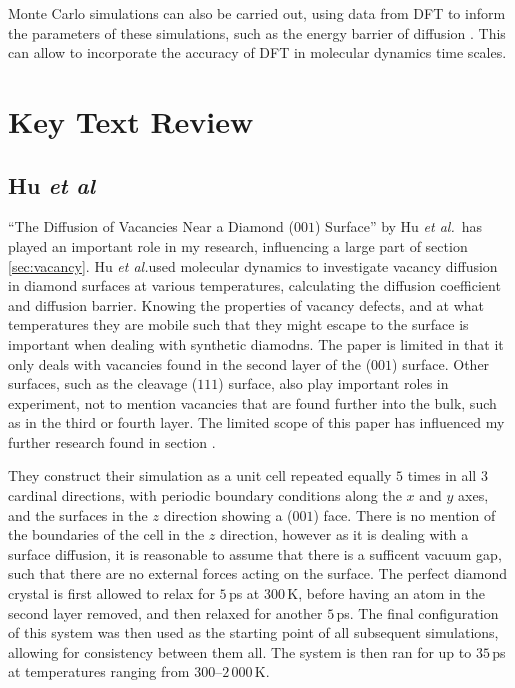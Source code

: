 \documentclass[10pt,a4paper,twocolumn,twoside]{extarticle}
\newcommand{\al}{\emph{et al.}}
\begin{document}
Monte Carlo simulations can also be carried out, using data from DFT to inform the parameters of these simulations, such as the energy barrier of diffusion \cite{radiation_modelling, HybridMonteCarlo}. This can allow to incorporate the accuracy of DFT in molecular dynamics time scales.



\section{Key Text Review}
\subsection{Hu \textit{et al}}
\label{Hu}
``The Diffusion of Vacancies Near a Diamond ($001$) Surface'' by Hu \al~has played an important role in my research, influencing a large part of section \ref{sec:vacancy}. Hu \al used molecular dynamics to investigate vacancy diffusion in diamond surfaces at various temperatures, calculating the diffusion coefficient and diffusion barrier. Knowing the properties of vacancy defects, and at what temperatures they are mobile such that they might escape to the surface is important when dealing with synthetic diamodns. The paper is limited in that it only deals with vacancies found in the second layer of the ($001$) surface. Other surfaces, such as the cleavage ($111$) surface, also play important roles in experiment, not to mention vacancies that are found further into the bulk, such as in the third or fourth layer. The limited scope of this paper has influenced my further research found in section .

They construct their simulation as a unit cell repeated equally $5$ times in all $3$ cardinal directions, with periodic boundary conditions along the $x$ and $y$ axes, and the surfaces in the $z$ direction showing a ($001$) face. There is no mention of the boundaries of the cell in the $z$ direction, however as it is dealing with a surface diffusion, it is reasonable to assume that there is a sufficent vacuum gap, such that there are no external forces acting on the surface. The perfect diamond crystal is first allowed to relax for $5$\,ps at $300$\,K, before having an atom in the second layer removed, and then relaxed for another $5$\,ps. The final configuration of this system was then used as the starting point of all subsequent simulations, allowing for consistency between them all. The system is then ran for up to $35$\,ps at temperatures ranging from $300$--$2\,000$\,K. 
\end{document}
